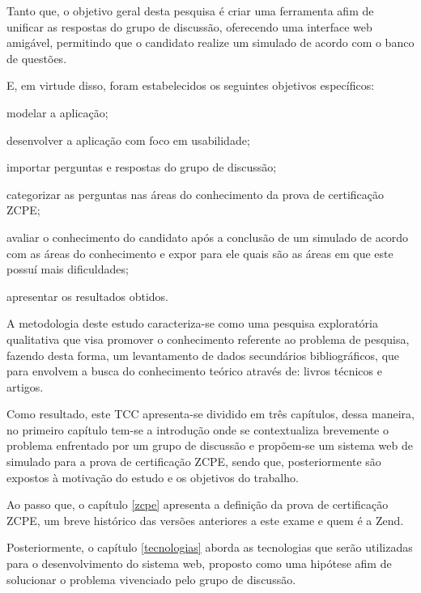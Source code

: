
Tanto que, o objetivo geral desta pesquisa é criar uma ferramenta afim de
unificar as respostas do grupo de discussão, oferecendo uma interface web
amigável, permitindo que o candidato realize um simulado de
acordo com o banco de questões.


E, em virtude disso, foram estabelecidos os seguintes objetivos
específicos:

\begin{alineas}
	\item modelar a aplicação;
    \item desenvolver a aplicação com foco em usabilidade;
    \item importar perguntas e respostas do grupo de discussão;
    \item categorizar as perguntas nas áreas do conhecimento da prova de
    certificação \acs{ZCPE};
    \item avaliar o conhecimento do candidato após a conclusão de um simulado 
    de acordo com as áreas do conhecimento e expor para ele quais são as áreas  em
    que este possuí mais dificuldades;
    \item apresentar os resultados obtidos.
\end{alineas}


A metodologia deste estudo caracteriza-se como uma pesquisa exploratória
qualitativa que visa promover o conhecimento referente ao problema de pesquisa, fazendo desta forma,
um levantamento de dados secundários bibliográficos, que para
 envolvem a busca do conhecimento 
teórico através de: livros técnicos e artigos.

Como resultado, este \acs{TCC} apresenta-se dividido em três capítulos, dessa
maneira, no primeiro capítulo tem-se a introdução onde se contextualiza brevemente o problema
enfrentado por um grupo de discussão e propõem-se um sistema web de
simulado para a prova de certificação \acs{ZCPE}, sendo que, posteriormente são
expostos à motivação do estudo e os objetivos do trabalho.

Ao passo que, o capítulo \ref{zcpe} apresenta a definição da prova de
certificação \acl{ZCPE}, um breve histórico das versões anteriores a este
exame e quem é a \acs{Zend}.

Posteriormente, o capítulo \ref{tecnologias} aborda as tecnologias que serão
utilizadas para o desenvolvimento do sistema web, proposto como uma hipótese 
afim de solucionar o problema vivenciado pelo grupo de discussão.


